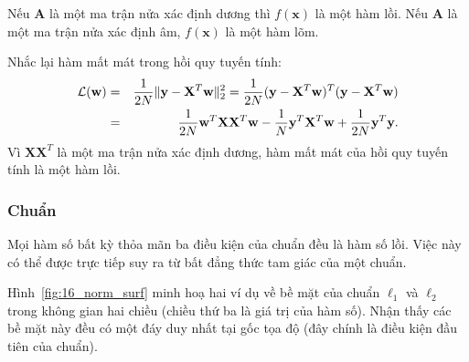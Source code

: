 Nếu $\mathbf{A}$ là một ma trận nửa xác định dương thì $f(\mathbf{x})$ là một
hàm lồi. Nếu $\mathbf{A}$ là một ma trận nửa xác định âm, $f(\mathbf{x})$
là một hàm lõm.

Nhắc lại hàm mất mát trong hồi quy tuyến tính:
\begin{eqnarray*}
\mathcal{L}(\mathbf{w}) &=& \frac{1}{2N} \|\mathbf{y} -
\mathbf{X}^T\mathbf{w}\|_2^2 = \frac{1}{2N} (\mathbf{y} -
\mathbf{X}^T\mathbf{w})^T(\mathbf{y} - \mathbf{X}^T\mathbf{w})  \\\
&=& \frac{1}{2N} \mathbf{w}^T\mathbf{X}\mathbf{X}^T\mathbf{w} -
\frac{1}{N}\mathbf{y}^T\mathbf{X}^T\mathbf{w} + \frac{1}{2N}\mathbf{y}^T\mathbf{y}.
\end{eqnarray*}
Vì $\mathbf{X}\mathbf{X}^T$ là một ma trận nửa xác định dương, hàm mất mát của
hồi quy tuyến tính là một hàm lồi.


\subsubsection{Chuẩn}
Mọi hàm số bất kỳ thỏa mãn ba điều kiện của chuẩn đều là hàm số lồi. Việc này có thể
được trực tiếp suy ra từ bất đẳng thức tam giác của một chuẩn.


Hình~\ref{fig:16_norm_surf} minh hoạ hai ví dụ về bề mặt của chuẩn $\ell_1$ và
$\ell_2$
trong không gian hai chiều (chiều thứ ba là giá trị của hàm
số). Nhận thấy các bề mặt này đều có {một đáy duy nhất} tại gốc tọa độ (đây chính là điều kiện đầu tiên của chuẩn).


